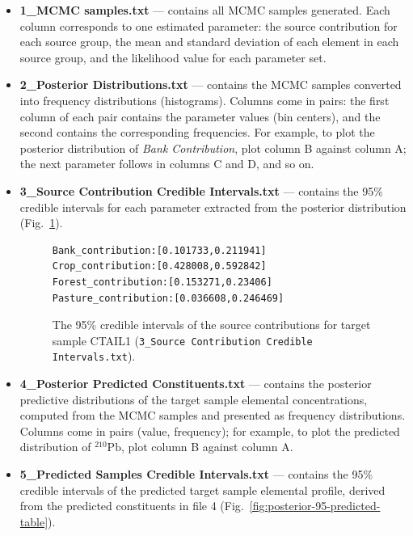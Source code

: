 \documentclass[12pt]{report}
\begin{document}
\begin{itemize}
    \item \textbf{1\_MCMC samples.txt} --- contains all MCMC samples generated. Each column corresponds to one estimated parameter: the source contribution for each source group, the mean and standard deviation of each element in each source group, and the likelihood value for each parameter set.
    \item \textbf{2\_Posterior Distributions.txt} --- contains the MCMC samples converted into frequency distributions (histograms). Columns come in pairs: the first column of each pair contains the parameter values (bin centers), and the second contains the corresponding frequencies. For example, to plot the posterior distribution of \textit{Bank Contribution}, plot column B against column A; the next parameter follows in columns C and D, and so on.
    \item \textbf{3\_Source Contribution Credible Intervals.txt} --- contains the 95\% credible intervals for each parameter extracted from the posterior distribution (Fig.~\ref{fig:posterior-95-table}).

    \begin{figure}[ht]
        \centering
            \begin{minipage}{0.92\textwidth}
\small
\begin{verbatim}
Bank_contribution:[0.101733,0.211941]
Crop_contribution:[0.428008,0.592842]
Forest_contribution:[0.153271,0.23406]
Pasture_contribution:[0.036608,0.246469]
\end{verbatim}
    \end{minipage}
        \caption{The 95\% credible intervals of the source contributions for target sample CTAIL1 (\texttt{3\_Source Contribution Credible Intervals.txt}).}
        \label{fig:posterior-95-table}
    \end{figure}
    \FloatBarrier

    \item \textbf{4\_Posterior Predicted Constituents.txt} --- contains the posterior predictive distributions of the target sample elemental concentrations, computed from the MCMC samples and presented as frequency distributions. Columns come in pairs (value, frequency); for example, to plot the predicted distribution of $^{210}\mathrm{Pb}$, plot column B against column A.

    \item \textbf{5\_Predicted Samples Credible Intervals.txt} --- contains the 95\% credible intervals of the predicted target sample elemental profile, derived from the predicted constituents in file 4 (Fig.~\ref{fig:posterior-95-predicted-table}).


\end{itemize}
\end{document}
